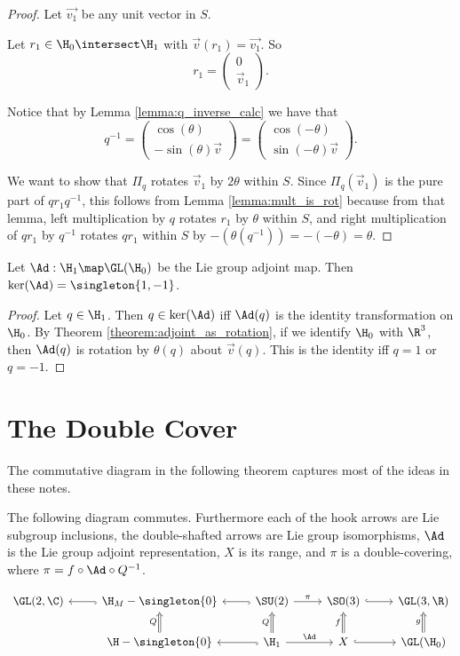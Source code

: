 \documentclass[oneside,12pt]{amsart}
\begin{document}
\begin{proof}
Let $\vec{v_1}$ be any unit vector in $S$.  

Let $r_1\in\H_0\intersect\H_1$ with
$\vec{v}(r_1)=\vec{v_1}$. So
$$r_1 = \begin{pmatrix} 0 \\ \vec{v}_1 \end{pmatrix}.$$

Notice that by Lemma \ref{lemma:q_inverse_calc} we have that
$$q^{-1} = \begin{pmatrix} \cos(\theta) \\ -\sin(\theta) \vec{v} \end{pmatrix}
= \begin{pmatrix} \cos(-\theta) \\ \sin(-\theta) \vec{v} \end{pmatrix}.$$


We want to show that $\Pi_q$ rotates $\vec{v}_1$ by $2\theta$ within $S$.
Since $\Pi_q(\vec{v}_1)$ is the pure part of $q r_1 q^{-1}$, this follows from 
Lemma \ref{lemma:mult_is_rot} because from that lemma, left multiplication by $q$
rotates $r_1$ by $\theta$ within $S$, and right multiplication of $q r_1$ by $q^{-1}$ rotates $q r_1$ within $S$ by
$-(\theta(q^{-1})) = -(-\theta) = \theta$.
\end{proof}

\begin{corollary}
\label{corollar:ker_adj}
Let $\Ad:\H_1 \map \GL(\H_0)$ be the Lie group adjoint map. Then $\ker(\Ad) = \singleton{1,-1}$.
\end{corollary}
\begin{proof}
Let $q\in\H_1$. Then $q\in\ker(\Ad)$ iff $\Ad(q)$ is the identity transformation on $\H_0$. By Theorem 
\ref{theorem:adjoint_as_rotation},
if we identify $\H_0$ with $\R^3$, then $\Ad(q)$ is rotation by $\theta(q)$ about $\vec{v}(q)$. This
is the identity iff $q=1$ or $q=-1$.
\end{proof}

\section{The Double Cover}
 
 The commutative diagram in the following theorem captures most of the ideas in these notes.

\begin{theorem}
The following diagram commutes. Furthermore each of the hook arrows are Lie subgroup inclusions,
the double-shafted arrows are Lie group isomorphisms, $\Ad$ is the Lie group adjoint representation, $X$ is its range, and $\pi$ is a double-covering, where $\pi = f \circ \Ad \circ Q^{-1}$.

$$
\begin{tikzcd}
   \GL(2,\C) & \H_M - \singleton{0} \arrow[l, hook] \arrow[d,Leftarrow,"Q"'] & \SU(2) \arrow[l, hook] \arrow[r, "\pi"] \arrow[d,Leftarrow,"Q"'] & \SO(3) \arrow[d,Leftarrow,"f"'] \arrow[r, hook] & \GL(3,\R)  \arrow[d,Leftarrow,"g"'] \\
 & \H - \singleton{0}   &  \H_1 \arrow[l, hook] \arrow[r, "\Ad"] & X  \arrow[r, hook] & \GL(\H_0) 
\end{tikzcd}
$$

\end{theorem}
\end{document}

